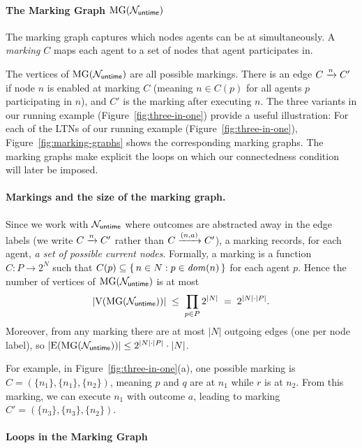\paragraph*{The Marking Graph $\operatorname{MG}(\mathcal{N}_{\mathsf{untime}})$}

The marking graph captures which nodes agents can be at simultaneously. A \emph{marking} $C$ maps each agent to a set of nodes that agent participates in. 

The vertices of $\operatorname{MG}(\mathcal{N}_{\mathsf{untime}})$ are all possible markings. There is an edge $C \xrightarrow{n} C'$ if node $n$ is enabled at marking $C$ (meaning $n \in C(p)$ for all agents $p$ participating in $n$), and $C'$ is the marking after executing $n$.
The three variants in our running example (Figure~\ref{fig:three-in-one}) provide a useful illustration: For each of the LTNs of our running example (Figure~\ref{fig:three-in-one}), Figure~\ref{fig:marking-graphs} shows the corresponding marking graphs. The marking graphs make explicit the loops on which our connectedness condition will later be imposed.


\paragraph*{Markings and the size of the marking graph.}
Since we work with $\mathcal{N}_{\mathsf{untime}}$ where outcomes are abstracted away in the edge labels (we write $C \xrightarrow{n} C'$ rather than $C \xrightarrow{(n,a)} C'$), a marking records, for each agent, \emph{a set of possible current nodes}.
Formally, a marking is a function $C:P \to 2^N$ such that $C(p)\subseteq \{\,n\in N : p\in \mathit{dom}(n)\,\}$ for each agent $p$.
Hence the number of vertices of $\operatorname{MG}(\mathcal{N}_{\mathsf{untime}})$ is at most
\[
|\mathrm{V}(\operatorname{MG}(\mathcal{N}_{\mathsf{untime}}))|
\;\le\;
\prod_{p\in P} 2^{|N|}
\;=\;
2^{|N|\cdot|P|}.
\]
Moreover, from any marking there are at most $|N|$ outgoing edges (one per node label), so
$|\mathrm{E}(\operatorname{MG}(\mathcal{N}_{\mathsf{untime}}))|\le 2^{|N|\cdot|P|}\cdot |N|$.

For example, in Figure~\ref{fig:three-in-one}(a), one possible marking is $C = (\{n_1\}, \{n_1\}, \{n_2\})$, meaning $p$ and $q$ are at $n_1$ while $r$ is at $n_2$. From this marking, we can execute $n_1$ with outcome $a$, leading to marking $C' = (\{n_3\}, \{n_3\}, \{n_2\})$.

\paragraph*{Loops in the Marking Graph}

